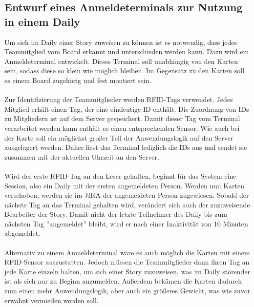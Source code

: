 \documentclass[12pt,titlepage]{scrartcl}
\begin{document}
		\subsection{Entwurf eines Anmeldeterminals zur Nutzung in einem Daily}
		Um sich im Daily einer Story zuweisen zu können ist es notwendig, dass jedes Teammitglied vom Board erkannt und unterschieden werden kann. Dazu wird ein Anmeldeterminal entwickelt. Dieses Terminal soll unabhängig von den Karten sein, sodass diese so klein wie möglich bleiben. Im Gegensatz zu den Karten soll es einem Board zugehörig und fest montiert sein. \\ \\
		Zur Identifizierung der Teammitglieder werden RFID-Tags verwendet. Jedes Mitglied erhält einen Tag, der eine eindeutige ID enthält. Die Zuordnung von IDs zu Mitgliedern ist auf dem Server gespeichert. Damit dieser Tag vom Terminal verarbeitet werden kann enthält es einen entsprechenden Sensor. Wie auch bei der Karte soll ein möglichst großer Teil der Anwendungslogik auf den Server ausgelagert werden. Daher liest das Terminal lediglich die IDs aus und sendet sie zusammen mit der aktuellen Uhrzeit an den Server. \\ \\
		Wird der erste RFID-Tag an den Leser gehalten, beginnt für das System eine Session, also ein Daily mit der ersten angemeldeten Person. Werden nun Karten verschoben, werden sie im JIRA der angemeldeten Person zugewiesen. Sobald der nächste Tag an das Terminal gehalten wird, verändert sich auch der zuzuweisende Bearbeiter der Story. Damit nicht der letzte Teilnehmer des Daily bis zum nächsten Tag ''angemeldet'' bleibt, wird er nach einer Inaktivität von 10 Minuten abgemeldet. \\ \\
		Alternativ zu einem Anmeldeterminal wäre es auch möglich die Karten mit einem RFID-Sensor auszustatten. Jedoch müssen die Teammitglieder dann ihren Tag an jede Karte einzeln halten, um sich einer Story zuzuweisen, was im Daily störender ist als sich nur zu Beginn anzumelden. Außerdem bekämen die Karten dadurch zum einen mehr Anwendungslogik, aber auch ein größeres Gewicht, was wie zuvor erwähnt vermieden werden soll. \\ 
\end{document}
